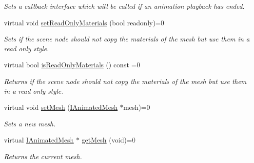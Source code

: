 \begin{DoxyCompactItemize}
\begin{DoxyCompactList}\small\item\em Sets a callback interface which will be called if an animation playback has ended. \end{DoxyCompactList}\item 
virtual void \hyperlink{classirr_1_1scene_1_1IAnimatedMeshSceneNode_af04e917ab3cae5631b06edad2d8a3a04}{set\+Read\+Only\+Materials} (bool readonly)=0
\begin{DoxyCompactList}\small\item\em Sets if the scene node should not copy the materials of the mesh but use them in a read only style. \end{DoxyCompactList}\item 
\mbox{\label{classirr_1_1scene_1_1IAnimatedMeshSceneNode_a8916713c72582d270f6363c9ed1b509e}} 
virtual bool \hyperlink{classirr_1_1scene_1_1IAnimatedMeshSceneNode_a8916713c72582d270f6363c9ed1b509e}{is\+Read\+Only\+Materials} () const =0
\begin{DoxyCompactList}\small\item\em Returns if the scene node should not copy the materials of the mesh but use them in a read only style. \end{DoxyCompactList}\item 
\mbox{\label{classirr_1_1scene_1_1IAnimatedMeshSceneNode_af3027cb62d62968a0ae85c9f15725668}} 
virtual void \hyperlink{classirr_1_1scene_1_1IAnimatedMeshSceneNode_af3027cb62d62968a0ae85c9f15725668}{set\+Mesh} (\hyperlink{classirr_1_1scene_1_1IAnimatedMesh}{I\+Animated\+Mesh} $\ast$mesh)=0
\begin{DoxyCompactList}\small\item\em Sets a new mesh. \end{DoxyCompactList}\item 
\mbox{\label{classirr_1_1scene_1_1IAnimatedMeshSceneNode_ad52e5bd15a2bfb6d0745c77d4329086b}} 
virtual \hyperlink{classirr_1_1scene_1_1IAnimatedMesh}{I\+Animated\+Mesh} $\ast$ \hyperlink{classirr_1_1scene_1_1IAnimatedMeshSceneNode_ad52e5bd15a2bfb6d0745c77d4329086b}{get\+Mesh} (void)=0
\begin{DoxyCompactList}\small\item\em Returns the current mesh. \end{DoxyCompactList}\item 

\end{DoxyCompactItemize}
